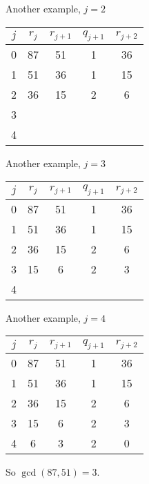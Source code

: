 \documentclass{beamer}
\begin{document}
\begin{frame}{Another example, $j=2$}

\begin{tabular}{|c|c|c|c|c|}\hline
$j$   &  $r_{j}$    & $r_{j+1}$ & $q_{j+1}$ & $r_{j+2}$ \\ \hline\hline
0     &  87         &  51       &    1      &   36      \\ \hline
1     &  51         &  36       &    1      &   15      \\ \hline
2     &  36         &  15       &    2      &   6       \\ \hline
3     &             &           &           &           \\ \hline
4     &             &           &           &           \\ \hline
\end{tabular}

\end{frame}

\begin{frame}{Another example, $j=3$}

\begin{tabular}{|c|c|c|c|c|}\hline
$j$   &  $r_{j}$    & $r_{j+1}$ & $q_{j+1}$ & $r_{j+2}$ \\ \hline\hline
0     &  87         &  51       &    1      &   36      \\ \hline
1     &  51         &  36       &    1      &   15      \\ \hline
2     &  36         &  15       &    2      &   6       \\ \hline
3     &  15         &   6       &    2      &   3       \\ \hline
4     &             &           &           &           \\ \hline
\end{tabular}

\end{frame}

\begin{frame}{Another example, $j=4$}

\begin{tabular}{|c|c|c|c|c|}\hline
$j$   &  $r_{j}$    & $r_{j+1}$ & $q_{j+1}$ & $r_{j+2}$ \\ \hline\hline
0     &  87         &  51       &    1      &   36      \\ \hline
1     &  51         &  36       &    1      &   15      \\ \hline
2     &  36         &  15       &    2      &   6       \\ \hline
3     &  15         &   6       &    2      &   3       \\ \hline
4     &   6         &   3       &    2      &   0       \\ \hline
\end{tabular}

\vspace{1em}

So $\gcd(87,51) = 3$.

\end{frame}
\end{document}

